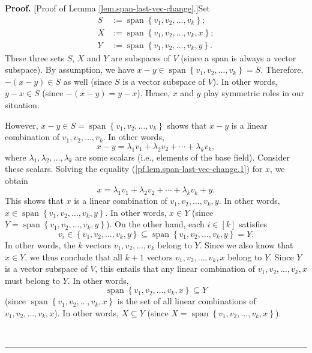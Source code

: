\documentclass[numbers=enddot,12pt,final,onecolumn,notitlepage]{scrartcl}%
\numberwithin{exer}{subsection}
\theoremstyle{definition}
\newenvironment{proof}[1][Proof]{\noindent\textbf{#1.} }{\ \rule{0.5em}{0.5em}}
\begin{document}
\begin{proof}
[Proof of Lemma \ref{lem.span-last-vec-change}.]Set%
\begin{align*}
S  &  :=\operatorname*{span}\left\{  v_{1},v_{2},\ldots,v_{k}\right\}  ;\\
X  &  :=\operatorname*{span}\left\{  v_{1},v_{2},\ldots,v_{k},x\right\}  ;\\
Y  &  :=\operatorname*{span}\left\{  v_{1},v_{2},\ldots,v_{k},y\right\}  .
\end{align*}
These three sets $S$, $X$ and $Y$ are subspaces of $V$ (since a span is always
a vector subspace). By assumption, we have $x-y\in\operatorname*{span}\left\{
v_{1},v_{2},\ldots,v_{k}\right\}  =S$. Therefore, $-\left(  x-y\right)  \in S$
as well (since $S$ is a vector subspace of $V$). In other words, $y-x\in S$
(since $-\left(  x-y\right)  =y-x$). Hence, $x$ and $y$ play symmetric roles
in our situation.

However, $x-y\in S=\operatorname*{span}\left\{  v_{1},v_{2},\ldots
,v_{k}\right\}  $ shows that $x-y$ is a linear combination of $v_{1}%
,v_{2},\ldots,v_{k}$. In other words,%
\begin{equation}
x-y=\lambda_{1}v_{1}+\lambda_{2}v_{2}+\cdots+\lambda_{k}v_{k},
\label{pf.lem.span-last-vec-change.1}%
\end{equation}
where $\lambda_{1},\lambda_{2},\ldots,\lambda_{k}$ are some scalars (i.e.,
elements of the base field). Consider these scalars. Solving the equality
(\ref{pf.lem.span-last-vec-change.1}) for $x$, we obtain%
\[
x=\lambda_{1}v_{1}+\lambda_{2}v_{2}+\cdots+\lambda_{k}v_{k}+y.
\]
This shows that $x$ is a linear combination of $v_{1},v_{2},\ldots,v_{k},y$.
In other words, $x\in\operatorname*{span}\left\{  v_{1},v_{2},\ldots
,v_{k},y\right\}  $. In other words, $x\in Y$ (since $Y=\operatorname*{span}%
\left\{  v_{1},v_{2},\ldots,v_{k},y\right\}  $). On the other hand, each
$i\in\left[  k\right]  $ satisfies%
\[
v_{i}\in\left\{  v_{1},v_{2},\ldots,v_{k},y\right\}  \subseteq
\operatorname*{span}\left\{  v_{1},v_{2},\ldots,v_{k},y\right\}  =Y.
\]
In other words, the $k$ vectors $v_{1},v_{2},\ldots,v_{k}$ belong to $Y$.
Since we also know that $x\in Y$, we thus conclude that all $k+1$ vectors
$v_{1},v_{2},\ldots,v_{k},x$ belong to $Y$. Since $Y$ is a vector subspace of
$V$, this entails that any linear combination of $v_{1},v_{2},\ldots,v_{k},x$
must belong to $Y$. In other words,%
\[
\operatorname*{span}\left\{  v_{1},v_{2},\ldots,v_{k},x\right\}  \subseteq Y
\]
(since $\operatorname*{span}\left\{  v_{1},v_{2},\ldots,v_{k},x\right\}  $ is
the set of all linear combinations of $v_{1},v_{2},\ldots,v_{k},x$). In other
words, $X\subseteq Y$ (since $X=\operatorname*{span}\left\{  v_{1}%
,v_{2},\ldots,v_{k},x\right\}  $).


\end{proof}
\end{document}
